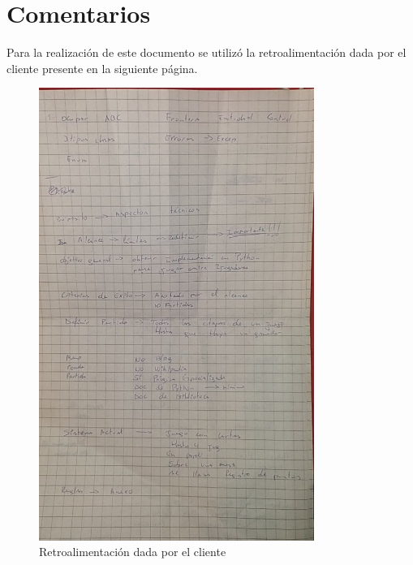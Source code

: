 \section{Comentarios}\label{cap:ending}
Para la realización de este documento se utilizó la retroalimentación dada por el cliente presente en la siguiente página.
\begin{figure}[H]
    \centering
    \includegraphics[width=0.8\textwidth]{imagenes/retroalimentacion1.jpg}
    \caption{Retroalimentación dada por el cliente}
    \label{fig:retroalimentacion}
\end{figure}

